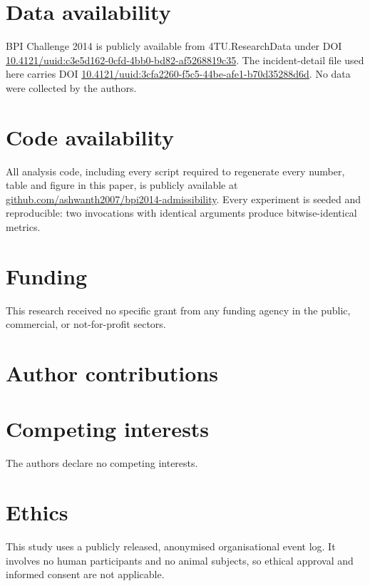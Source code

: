 \section*{Data availability}

BPI Challenge 2014 is publicly available from 4TU.ResearchData under DOI
\href{https://doi.org/10.4121/uuid:c3e5d162-0cfd-4bb0-bd82-af5268819c35}%
{10.4121/\allowbreak uuid:\allowbreak c3e5d162-0cfd-\allowbreak 4bb0-bd82-\allowbreak af5268819c35}. The incident-detail file used here
carries DOI \href{https://doi.org/10.4121/uuid:3cfa2260-f5c5-44be-afe1-b70d35288d6d}%
{10.4121/\allowbreak uuid:\allowbreak 3cfa2260-f5c5-\allowbreak 44be-afe1-\allowbreak b70d35288d6d}. No data were collected by the authors.

\section*{Code availability}

All analysis code, including every script required to regenerate every number, table and figure
in this paper, is publicly available at
\href{https://github.com/ashwanth2007/bpi2014-admissibility}{github.com/ashwanth2007/\allowbreak bpi2014-admissibility}. Every experiment is seeded and reproducible: two
invocations with identical arguments produce bitwise-identical metrics.

\section*{Funding}

This research received no specific grant from any funding agency in the public, commercial,
or not-for-profit sectors.

\section*{Author contributions}


\section*{Competing interests}

The authors declare no competing interests.

\section*{Ethics}

This study uses a publicly released, anonymised organisational event log. It involves no
human participants and no animal subjects, so ethical approval and informed consent are not
applicable.
